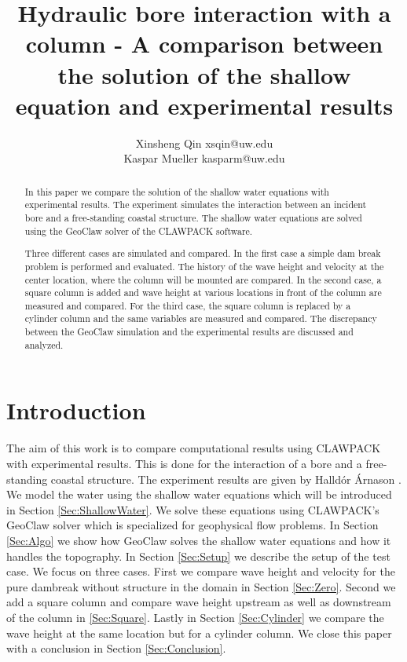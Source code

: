 \documentclass[11pt]{article}
\title{Hydraulic bore interaction with a column - A comparison between the solution of the shallow equation and experimental results}
\author{Xinsheng Qin xsqin@uw.edu\\
        Kaspar Mueller kasparm@uw.edu}
\begin{document}
\maketitle

\begin{abstract}
In this paper we compare the solution of the shallow water equations with experimental results. The experiment simulates the interaction between an incident bore and a free-standing coastal structure. The shallow water equations are solved using the GeoClaw solver of the CLAWPACK software.
\par
Three different cases are simulated and compared. In the first case a simple dam break problem is performed and evaluated.
The history of the wave height and velocity at the center location, where the column will be mounted are compared. 
In the second case, a square column is added and wave height at various locations in front of the column are measured and compared. 
For the third case, the square column is replaced by a cylinder column and the same variables are measured and compared. 
The discrepancy between the GeoClaw simulation and the experimental results are discussed and analyzed.
\end{abstract}

\section{Introduction}\label{Sec:intro}
The aim of this work is to compare computational results using CLAWPACK with experimental results. This is done for the interaction of a bore and a free-standing coastal structure. The experiment results are given by Halld\'or \'Arnason \cite{HA}. We model the water using the shallow water equations which will be introduced in Section \ref{Sec:ShallowWater}. We solve these equations using CLAWPACK's GeoClaw solver which is specialized for geophysical flow problems. In Section \ref{Sec:Algo} we show how GeoClaw solves the shallow water equations and how it handles the topography. In Section \ref{Sec:Setup} we describe the setup of the test case. We focus on three cases. First we compare wave height and velocity for the pure dambreak without structure in the domain in Section \ref{Sec:Zero}. Second we add a square column and compare wave height upstream as well as downstream of the column in \ref{Sec:Square}. Lastly in Section \ref{Sec:Cylinder} we compare the wave height at the same location but for a cylinder column. We close this paper with a conclusion in Section \ref{Sec:Conclusion}.
\end{document}
